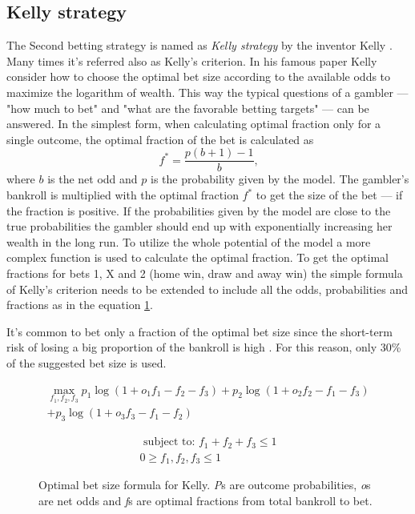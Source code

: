 \subsection{Kelly strategy}
The Second betting strategy is named as \textit{Kelly strategy} by the inventor Kelly \cite{kelly2011new}. Many times it's referred also as Kelly's criterion. In his famous paper \cite{kelly2011new} Kelly consider how to choose the optimal bet size according to the available odds to maximize the logarithm of wealth. This way the typical questions of a gambler --- "how much to bet" and "what are the favorable betting targets" ---  can be answered. In the simplest form, when calculating optimal fraction only for a single outcome, the optimal fraction of the bet is calculated as
\begin{equation}
f ^ { * } =  \frac { p ( b + 1 ) - 1 } { b }\text{,}
\end{equation}
where $b$ is the net odd and $p$ is the probability given by the model. The gambler's bankroll is multiplied with the optimal fraction $f^{*}$ to get the size of the bet --- if the fraction is positive. If the probabilities given by the model are close to the true probabilities the gambler should end up with exponentially increasing her wealth in the long run. To utilize the whole potential of the model a more complex function is used to calculate the optimal fraction. To get the optimal fractions for bets 1, X and 2 (home win, draw and away win) the simple formula of Kelly's criterion needs to be extended to include all the odds, probabilities and fractions as in the equation \ref{eq:kelly}.

It's common to bet only a fraction of the optimal bet size since the short-term risk of losing a big proportion of the bankroll is high \cite{maclean2011medium}. For this reason, only 30\% of the suggested bet size is used.
\begin{figure}
    \caption{Optimal bet size formula for Kelly. \textit{P}s are outcome probabilities, \textit{o}s are net odds and \textit{f}s are optimal fractions from total bankroll to bet.}
     \begin{equation}
        \begin{split}
            \max_{f_1, f_2, f_3} p_1  \log(1 + o_1 f_1 - f_2 - f_3) + p_2 \log(1 + o_2 f_2 - f_1 - f_3)  \\
            + p_3 \log(1 + o_3 f_3 - f_1 - f_2)
        \end{split}
     \end{equation}

    \begin{equation*}
        \begin{split}
            \text { subject to: }  f_1 + f_2 + f_3 \leq 1 \\
             0 \geq f_1, f_2, f_3 \leq 1
         \end{split}
    \end{equation*}
    \label{eq:kelly}
\end{figure}

